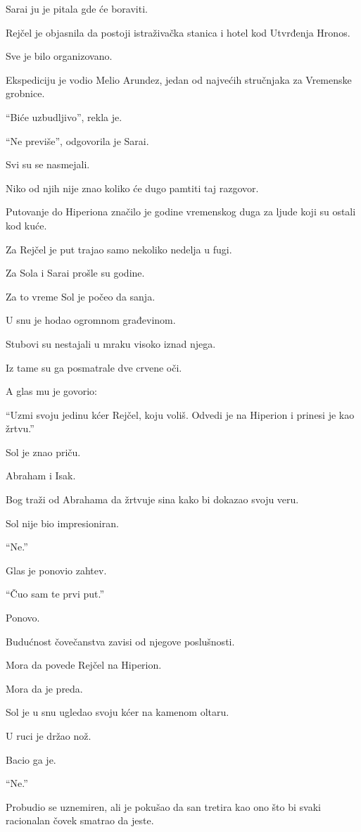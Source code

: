 Sarai ju je pitala gde će boraviti.

Rejčel je objasnila da postoji istraživačka stanica i hotel kod Utvrđenja Hronos.

Sve je bilo organizovano.

Ekspediciju je vodio Melio Arundez, jedan od najvećih stručnjaka za Vremenske grobnice.

``Biće uzbudljivo'', rekla je.

``Ne previše'', odgovorila je Sarai.

Svi su se nasmejali.

Niko od njih nije znao koliko će dugo pamtiti taj razgovor.

\bigskip

Putovanje do Hiperiona značilo je godine vremenskog duga za ljude koji su ostali kod kuće.

Za Rejčel je put trajao samo nekoliko nedelja u fugi.

Za Sola i Sarai prošle su godine.

Za to vreme Sol je počeo da sanja.

U snu je hodao ogromnom građevinom.

Stubovi su nestajali u mraku visoko iznad njega.

Iz tame su ga posmatrale dve crvene oči.

A glas mu je govorio:

``Uzmi svoju jedinu kćer Rejčel, koju voliš. Odvedi je na Hiperion i prinesi je kao žrtvu.''

Sol je znao priču.

Abraham i Isak.

Bog traži od Abrahama da žrtvuje sina kako bi dokazao svoju veru.

Sol nije bio impresioniran.

``Ne.''

Glas je ponovio zahtev.

``Čuo sam te prvi put.''

Ponovo.

Budućnost čovečanstva zavisi od njegove poslušnosti.

Mora da povede Rejčel na Hiperion.

Mora da je preda.

Sol je u snu ugledao svoju kćer na kamenom oltaru.

U ruci je držao nož.

Bacio ga je.

``Ne.''

Probudio se uznemiren, ali je pokušao da san tretira kao ono što bi svaki racionalan čovek smatrao da jeste.


